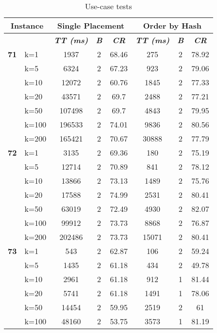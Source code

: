     \begin{table}[htbp]
    \caption{Use-case tests}
    \begin{tabular}{|l|l|c|c|c|c|c|c|}
    
    \multicolumn{ 2}{|c|}{\textbf{Instance}} & \multicolumn{ 3}{c|}{\textbf{Single Placement}} & \multicolumn{ 3}{c|}{\textbf{Order by Hash}} \\ \hline
    \multicolumn{ 2}{|l|}{} & \textbf{\textit{TT (ms)}} & \textbf{\textit{B}} & \textbf{\textit{CR}} & \textbf{\textit{TT (ms)}} & \textbf{\textit{B}} & \textbf{\textit{CR}} \\ \hline
    \multicolumn{1}{|r|}{\textbf{71}} & k=1 & 1937 & 2 & 68.46 & 275 & 2 & 78.92 \\ 
     & k=5 & 6324 & 2 & 67.23 & 923 & 2 & 79.06 \\ 
     & k=10 & 12072 & 2 & 60.76 & 1845 & 2 & 77.33 \\ 
     & k=20 & 43571 & 2 & 69.7 & 2488 & 2 & 77.21 \\ 
     & k=50 & 107498 & 2 & 69.7 & 4843 & 2 & 79.95 \\ 
     & k=100 & 196533 & 2 & 74.01 & 9836 & 2 & 80.56 \\ 
     & k=200 & 165421 & 2 & 70.67 & 30888 & 2 & 77.79 \\ \hline
    \multicolumn{1}{|r|}{\textbf{72}} & k=1 & 3135 & 2 & 69.36 & 180 & 2 & 75.19 \\ 
     & k=5 & 12714 & 2 & 70.89 & 841 & 2 & 78.12 \\ 
     & k=10 & 13866 & 2 & 73.13 & 1489 & 2 & 75.76 \\ 
     & k=20 & 17588 & 2 & 74.99 & 2531 & 2 & 80.41 \\ 
     & k=50 & 63019 & 2 & 72.49 & 4930 & 2 & 82.07 \\ 
     & k=100 & 99912 & 2 & 73.73 & 8868 & 2 & 76.87 \\ 
     & k=200 & 202486 & 2 & 73.73 & 15071 & 2 & 80.41 \\ \hline
    \multicolumn{1}{|r|}{\textbf{73}} & k=1 & 543 & 2 & 62.87 & 106 & 2 & 59.24 \\ 
     & k=5 & 1435 & 2 & 61.18 & 434 & 2 & 49.78 \\ 
     & k=10 & 2961 & 2 & 61.18 & 912 & 1 & 81.44 \\ 
     & k=20 & 5741 & 2 & 61.18 & 1491 & 1 & 78.06 \\ 
     & k=50 & 14454 & 2 & 59.95 & 2519 & 2 & 61 \\ 
     & k=100 & 48160 & 2 & 53.75 & 3573 & 1 & 81.19 \\ 

\end{tabular}
\end{table}

